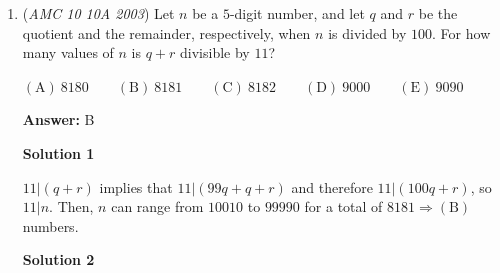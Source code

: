 \begin{enumerate}
 $\mathrm{(A) \ } 8\qquad \mathrm{(B) \ } 9\qquad \mathrm{(C) \ } 10\qquad \mathrm{(D) \ } 11\qquad \mathrm{(E) \ } 12$

 \textbf{Answer: }E



\textbf{Solution}

Let $R_i$ and $B_j$ designate the red card numbered $i$ and the blue card numbered $j$, respectively. 

 $B_5$ is the only blue card that $R_5$ evenly divides, so $R_5$ must be at one end of the stack and $B_5$ must be the card next to it. 

 $R_1$ is the only other red card that evenly divides $B_5$, so $R_1$ must be the other card next to $B_5$. 

 $B_4$ is the only blue card that $R_4$ evenly divides, so $R_4$ must be at one end of the stack and $B_4$ must be the card next to it. 

 $R_2$ is the only other red card that evenly divides $B_4$, so $R_2$ must be the other card next to $B_4$. 

 $R_2$ doesn't evenly divide $B_3$, so $B_3$ must be next to $R_1$, $B_6$ must be next to $R_2$, and $R_3$ must be in the middle. 

 This yields the following arrangement from top to bottom: $\{R_5,B_5,R_1,B_3,R_3,B_6,R_2,B_4,R_4\}$

 Therefore, the sum of the numbers on the middle three cards is $3+3+6=\boxed{\mathrm{(E)}\ 12}$.

 


	\item (\textit{AMC 10 10A 2003}) Let $n$ be a $5$-digit number, and let $q$ and $r$ be the quotient and the remainder, respectively, when $n$ is divided by $100$. For how many values of $n$ is $q+r$ divisible by $11$? 


 $\mathrm{(A) \ } 8180\qquad \mathrm{(B) \ } 8181\qquad \mathrm{(C) \ } 8182\qquad \mathrm{(D) \ } 9000\qquad \mathrm{(E) \ } 9090$

 \textbf{Answer: }B



\textbf{Solution 1}

$11|(q+r)$ implies that $11|(99q+q+r)$ and therefore $11|(100q+r)$, so $11|n$. Then, $n$ can range from $10010$ to $99990$ for a total of $\boxed{8181\Rightarrow \mathrm{(B)}}$ numbers.

 



\textbf{Solution 2}


\end{enumerate}
